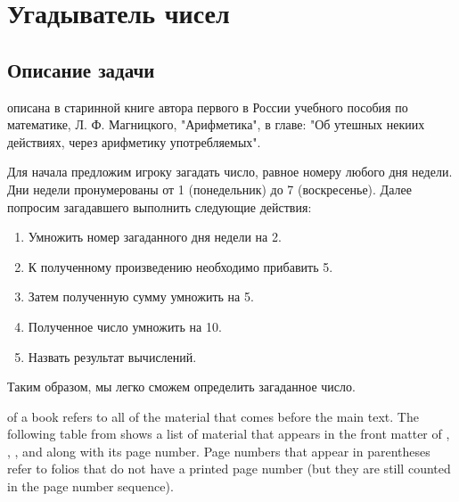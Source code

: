 \chapter{Угадыватель чисел}
\label{ch:guessnumbers}
\section{Описание задачи}
 описана в старинной книге автора первого в России учебного пособия по математике, Л. Ф. Магницкого, "Арифметика", в главе: "Об утешных некиих действиях, через арифметику употребляемых".

Для начала предложим игроку загадать число, равное номеру любого дня недели. Дни недели пронумерованы от 1 (понедельник) до 7 (воскресенье). Далее попросим загадавшего выполнить следующие действия:

\begin{enumerate}
\item Умножить номер загаданного дня недели на 2.
\item К полученному произведению необходимо прибавить 5.
\item Затем полученную сумму умножить на 5.
\item Полученное число умножить на 10.
\item Назвать результат вычислений.
\end{enumerate}
Таким образом, мы легко сможем определить загаданное число.


 of a book refers to all of the material that
comes before the main text.  The following table from shows a list of
material that appears in the front matter of \VDQI, \EI, \VE, and \BE
along with its page number.  Page numbers that appear in parentheses refer
to folios that do not have a printed page number (but they are still
counted in the page number sequence).
